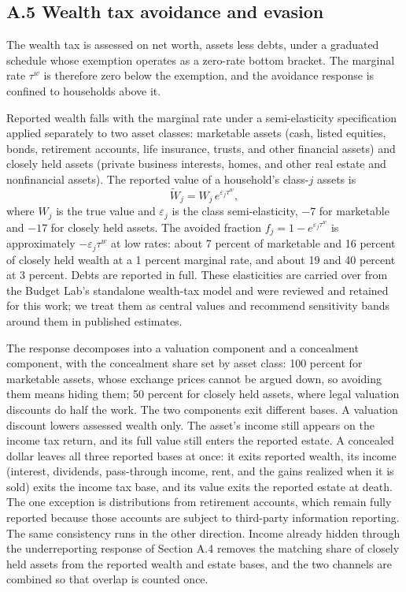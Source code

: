 \documentclass[10pt,twocolumn]{article}
\begin{document}
\subsection*{A.5 Wealth tax avoidance and evasion}

The wealth tax is assessed on net worth, assets less debts, under a graduated
schedule whose exemption operates as a zero-rate bottom bracket. The marginal
rate $\tau^w$ is therefore zero below the exemption, and the avoidance
response is confined to households above it.

Reported wealth falls with the marginal rate under a semi-elasticity
specification applied separately to two asset classes: marketable assets
(cash, listed equities, bonds, retirement accounts, life insurance, trusts,
and other financial assets) and closely held assets (private business
interests, homes, and other real estate and nonfinancial assets). The reported
value of a household's class-$j$ assets is
\begin{equation*}
\tilde{W}_j = W_j \, e^{\varepsilon_j \tau^w},
\end{equation*}
where $W_j$ is the true value and $\varepsilon_j$ is the class
semi-elasticity, $-7$ for marketable and $-17$ for closely held assets. The
avoided fraction $f_j = 1 - e^{\varepsilon_j \tau^w}$ is approximately
$-\varepsilon_j \tau^w$ at low rates: about 7 percent of marketable and 16
percent of closely held wealth at a 1 percent marginal rate, and about 19 and
40 percent at 3 percent. Debts are reported in full. These elasticities are
carried over from the Budget Lab's standalone wealth-tax model and were
reviewed and retained for this work; we treat them as central values and
recommend sensitivity bands around them in published estimates.

The response decomposes into a valuation component and a concealment
component, with the concealment share set by asset class: 100 percent for
marketable assets, whose exchange prices cannot be argued down, so avoiding
them means hiding them; 50 percent for closely held assets, where legal
valuation discounts do half the work. The two components exit different bases.
A valuation discount lowers assessed wealth only. The asset's income still
appears on the income tax return, and its full value still enters the reported
estate. A concealed dollar leaves all three reported bases at once: it exits
reported wealth, its income (interest, dividends, pass-through income, rent,
and the gains realized when it is sold) exits the income tax base, and its
value exits the reported estate at death. The one exception is distributions
from retirement accounts, which remain fully reported because those accounts
are subject to third-party information reporting. The same consistency runs in
the other direction. Income already hidden through the underreporting response
of Section A.4 removes the matching share of closely held assets from the
reported wealth and estate bases, and the two channels are combined so that
overlap is counted once.
\end{document}
